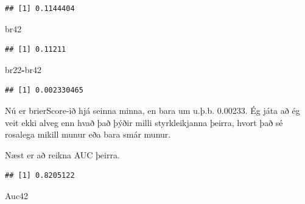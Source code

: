 \documentclass[
]{article}
\newenvironment{Shaded}{\begin{snugshade}}{\end{snugshade}}
\newcommand{\DataTypeTok}[1]{\textcolor[rgb]{0.13,0.29,0.53}{#1}}
\newcommand{\KeywordTok}[1]{\textcolor[rgb]{0.13,0.29,0.53}{\textbf{#1}}}
\newcommand{\NormalTok}[1]{#1}
\newcommand{\OperatorTok}[1]{\textcolor[rgb]{0.81,0.36,0.00}{\textbf{#1}}}
\newcommand{\StringTok}[1]{\textcolor[rgb]{0.31,0.60,0.02}{#1}}
\begin{document}
\begin{verbatim}
## [1] 0.1144404
\end{verbatim}

\begin{Shaded}
\begin{Highlighting}[]
\NormalTok{br42}
\end{Highlighting}
\end{Shaded}

\begin{verbatim}
## [1] 0.11211
\end{verbatim}

\begin{Shaded}
\begin{Highlighting}[]
\NormalTok{br22}\OperatorTok{-}\NormalTok{br42}
\end{Highlighting}
\end{Shaded}

\begin{verbatim}
## [1] 0.002330465
\end{verbatim}

Nú er brierScore-ið hjá seinna minna, en bara um u.þ.b. 0.00233. Ég játa að ég veit ekki alveg enn hvað það þýðir milli styrkleikjanna þeirra, hvort það sé rosalega mikill munur eða bara smár munur.

Næst er að reikna AUC þeirra.

\begin{Shaded}
\end{Shaded}

\begin{verbatim}
## [1] 0.8205122
\end{verbatim}

\begin{Shaded}
\begin{Highlighting}[]
\NormalTok{Auc42}
\end{Highlighting}
\end{Shaded}
\end{document}
